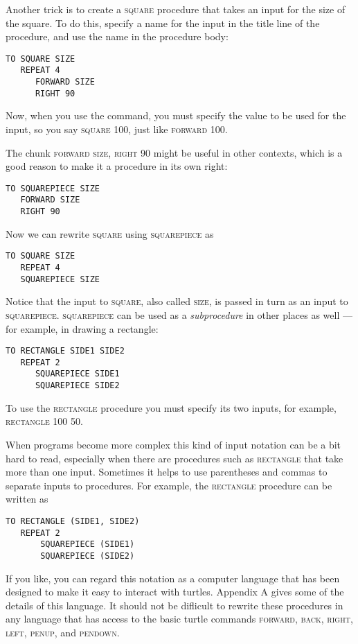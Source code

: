 \documentclass{book}
\begin{document}
Another trick is to create a \textsc{square} procedure that takes an input for the size of the square. To do this, specify a name for the input in the title line of the procedure, and use the name in the procedure body:

\begin{verbatim}
TO SQUARE SIZE
   REPEAT 4
      FORWARD SIZE
      RIGHT 90
\end{verbatim}
Now, when you use the command, you must specify the value to be used for the 
input, so you say \textsc{square 100}, just like \textsc{forward 100}. 

The chunk \textsc{forward size}, \textsc{right 90}  might be useful in other 
contexts, which is a good reason to make it a procedure in its own right:


\begin{verbatim}
TO SQUAREPIECE SIZE
   FORWARD SIZE
   RIGHT 90
\end{verbatim}
Now we can rewrite \textsc{square} using \textsc{squarepiece} as

\begin{verbatim}
TO SQUARE SIZE
   REPEAT 4
   SQUAREPIECE SIZE
\end{verbatim}
Notice that the input to \textsc{square}, also called \textsc{size}, 
is passed in turn as an input to \textsc{squarepiece}. \textsc{squarepiece} 
can be used as a {\em subprocedure} in other places as well --- for example, in drawing 
a rectangle:

\begin{verbatim}
TO RECTANGLE SIDE1 SIDE2
   REPEAT 2
      SQUAREPIECE SIDE1
      SQUAREPIECE SIDE2
\end{verbatim}
To use the \textsc{rectangle} procedure you must specify its two inputs, for
example, \textsc{rectangle 100 50}.

When programs become more complex this kind of input notation
can be a bit hard to read, especially when there are procedures such as
\textsc{rectangle} that take more than one input. Sometimes it helps to use
parentheses and commas to separate inputs to procedures. For example,
the \textsc{rectangle} procedure can be written as

\begin{verbatim}
TO RECTANGLE (SIDE1, SIDE2)
   REPEAT 2
       SQUAREPIECE (SIDE1)
       SQUAREPIECE (SIDE2)
\end{verbatim}
If you like, you can regard this notation as a computer language that
has been designed to make it easy to interact with turtles. Appendix
A gives some of the details of this language. It should not be diflicult
to rewrite these procedures in any language that has access to the basic
turtle commands \textsc{forward}, \textsc{back}, \textsc{right}, \textsc{left}, \textsc{penup}, and \textsc{pendown}.
\end{document}
